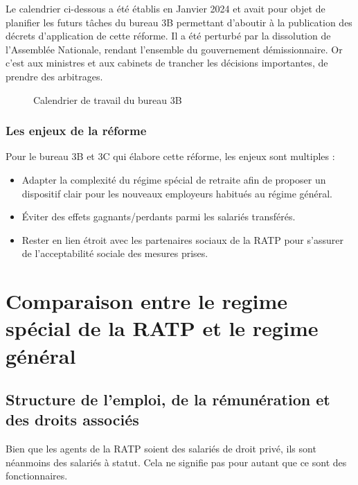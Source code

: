 Le calendrier ci-dessous a été établis en Janvier 2024 et avait pour objet de planifier les futurs tâches du bureau 3B permettant d'aboutir à la publication des décrets d'application de cette réforme. Il a été perturbé par la dissolution de l'Assemblée Nationale, rendant l'ensemble du gouvernement démissionnaire. Or c'est aux ministres et aux cabinets de trancher les décisions importantes, de prendre des arbitrages.

\begin{figure}[htbp]
    \centering
    
        \caption{Calendrier de travail du bureau 3B}\label{fig:retroplanning}
\end{figure}


  \subsubsection{Les enjeux de la réforme}

Pour le bureau 3B et 3C qui élabore cette réforme, les enjeux sont multiples :
\begin{itemize}
    \item Adapter la complexité du régime spécial de retraite afin de proposer un dispositif clair pour les nouveaux employeurs habitués au régime général.
    \item Éviter des effets gagnants/perdants parmi les salariés transférés.
    \item Rester en lien étroit avec les partenaires sociaux de la RATP pour s'assurer de l'acceptabilité sociale des mesures prises.
\end{itemize}

   
\clearpage 

\section{Comparaison entre le regime spécial de la RATP et le regime général}

\subsection{Structure de l'emploi, de la rémunération et des droits associés}

Bien que les agents de la RATP soient des salariés de droit privé, ils sont néanmoins des salariés à statut. Cela ne signifie pas pour autant que ce sont des fonctionnaires.

